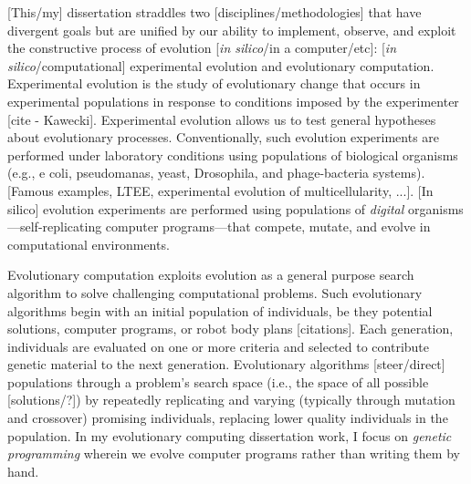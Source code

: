 

[This/my] dissertation straddles two [disciplines/methodologies] that have divergent goals but are unified by our ability to implement, observe, and exploit the constructive process of evolution [\textit{in silico}/in a computer/etc]: [\textit{in silico}/computational] experimental evolution and evolutionary computation.
Experimental evolution is the study of evolutionary change that occurs in experimental populations in response to conditions imposed by the experimenter [cite - Kawecki].
Experimental evolution allows us to test general hypotheses about evolutionary processes. 
Conventionally, such evolution experiments are performed under laboratory conditions using populations of biological organisms (e.g., e coli, pseudomanas, yeast, Drosophila, and phage-bacteria systems). 
[Famous examples, LTEE, experimental evolution of multicellularity, ...].
[In silico] evolution experiments are performed using populations of \textit{digital} organisms---self-replicating computer programs---that compete, mutate, and evolve in computational environments. 

Evolutionary computation exploits evolution as a general purpose search algorithm to solve challenging computational problems.
Such evolutionary algorithms begin with an initial population of individuals, be they potential solutions, computer programs, or robot body plans [citations]. 
Each generation, individuals are evaluated on one or more criteria and selected to contribute genetic material to the next generation.
Evolutionary algorithms [steer/direct] populations through a problem's search space (i.e., the space of all possible [solutions/?]) by repeatedly replicating and varying (typically through mutation and crossover) promising individuals, replacing lower quality individuals in the population.
In my evolutionary computing dissertation work, I focus on \textit{genetic programming} wherein we evolve computer programs rather than writing them by hand.

